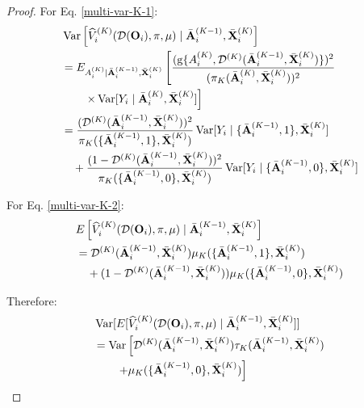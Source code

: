 \documentclass[11pt]{article}
\theoremstyle{referenceplain}
\theoremstyle{referencedefinition}
\theoremstyle{referenceremark}
\begin{document}
\begin{proof}
For Eq. \eqref{multi-var-K-1}:
\begin{align}
    &\operatorname{Var}\left[\widehat{V}_i^{(K)}(\mathcal{D}(\mathbf{O}_i),\pi,\mu) \mid \bar{\mathbf{A}}_i^{(K-1)}, \bar{\mathbf{X}}_i^{(K)}\right]\notag\\
    &= E_{A_i^{(K)}|\bar{\mathbf{A}}_i^{(K-1)}, \bar{\mathbf{X}}_i^{(K)}}\left[\frac{(\mathrm{g}\{A_i^{(K)}, \mathcal{D}^{(K)}(\bar{\mathbf{A}}_i^{(K-1)},\bar{\mathbf{X}}_i^{(K)})\})^2}{(\pi_K(\bar{\mathbf{A}}_i^{(K)}, \bar{\mathbf{X}}_i^{(K)}))^2}\right.\notag\\
    &\quad\quad\left.\times \operatorname{Var}[Y_i \mid \bar{\mathbf{A}}_i^{(K)}, \bar{\mathbf{X}}_i^{(K)}]\right]\notag\\
    &= \frac{(\mathcal{D}^{(K)}(\bar{\mathbf{A}}_i^{(K-1)},\bar{\mathbf{X}}_i^{(K)}))^2}{\pi_K(\{\bar{\mathbf{A}}_i^{(K-1)},1\}, \bar{\mathbf{X}}_i^{(K)})}\operatorname{Var}[Y_i \mid \{\bar{\mathbf{A}}_i^{(K-1)},1\}, \bar{\mathbf{X}}_i^{(K)}]\label{multi-var-K-cond-1}\\
    &\quad + \frac{(1-\mathcal{D}^{(K)}(\bar{\mathbf{A}}_i^{(K-1)},\bar{\mathbf{X}}_i^{(K)}))^2}{\pi_K(\{\bar{\mathbf{A}}_i^{(K-1)},0\}, \bar{\mathbf{X}}_i^{(K)})}\operatorname{Var}[Y_i \mid \{\bar{\mathbf{A}}_i^{(K-1)},0\}, \bar{\mathbf{X}}_i^{(K)}]\label{multi-var-K-cond-2}
\end{align}

For Eq. \eqref{multi-var-K-2}:
\begin{align}
    &E\left[\widehat{V}_i^{(K)}(\mathcal{D}(\mathbf{O}_i),\pi,\mu) \mid \bar{\mathbf{A}}_i^{(K-1)}, \bar{\mathbf{X}}_i^{(K)}\right]\notag\\
    &= \mathcal{D}^{(K)}(\bar{\mathbf{A}}_i^{(K-1)},\bar{\mathbf{X}}_i^{(K)}) \mu_K(\{\bar{\mathbf{A}}_i^{(K-1)},1\}, \bar{\mathbf{X}}_i^{(K)})\notag\\
    &\quad + (1-\mathcal{D}^{(K)}(\bar{\mathbf{A}}_i^{(K-1)},\bar{\mathbf{X}}_i^{(K)})) \mu_K(\{\bar{\mathbf{A}}_i^{(K-1)},0\}, \bar{\mathbf{X}}_i^{(K)})
\end{align}

Therefore:
\begin{align}
    &\operatorname{Var}[E[\widehat{V}_i^{(K)}(\mathcal{D}(\mathbf{O}_i),\pi,\mu) \mid \bar{\mathbf{A}}_i^{(K-1)}, \bar{\mathbf{X}}_i^{(K)}]]\notag\\
    &= \operatorname{Var}\left[\mathcal{D}^{(K)}(\bar{\mathbf{A}}_i^{(K-1)},\bar{\mathbf{X}}_i^{(K)}) \tau_K(\bar{\mathbf{A}}_i^{(K-1)},\bar{\mathbf{X}}_i^{(K)})\right.\notag\\
    &\quad\quad\left.+ \mu_K(\{\bar{\mathbf{A}}_i^{(K-1)},0\}, \bar{\mathbf{X}}_i^{(K)})\right]
\end{align}


\end{proof}
\end{document}
